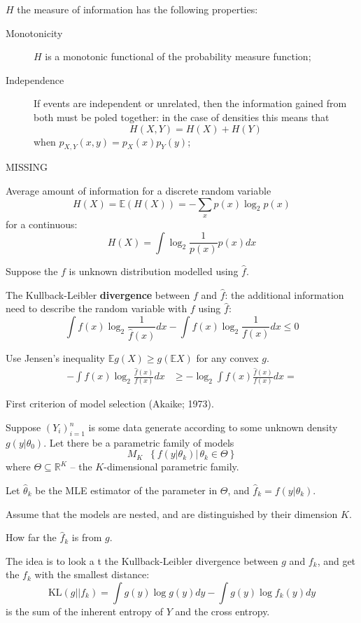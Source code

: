 \documentclass[a4paper]{article}
\newcommand{\obj}[1]{{\left\{ #1 \right \}}}
\newcommand{\brac}[1]{{\left ( #1 \right )}}
\newcommand{\induc}[1]{{\left . #1 \right \vert}}
\newcommand{\Real}{\mathbb{R}}
\newcommand{\Ex}[0]{{\mathbb{E}}}
\newcommand{\defn}{\mathop{\overset{\Delta}{=}}\nolimits}
\begin{document}
$H$ the measure of information has the following properties: \begin{description}
	\item[Monotonicity] $H$ is a monotonic functional of the probability measure function;
	\item[Independence] If events are independent or unrelated, then the information gained from both must be poled together: in the case of densities this means that
\[H(X,Y) = H(X)+H(Y)\]
when $p_{X,Y}(x,y) = p_X(x) p_Y(y)$;
	\item[MISSING]
\end{description}

Average amount of information for a discrete random variable
\[H(X) = \Ex\brac{H(X)} = - \sum_x p(x) \log_2 p(x)\]
for a continuous:
\[H(X) = \int \log_2\frac{1}{p(x)} p(x) dx\]

Suppose the $f$ is unknown distribution modelled using $\hat{f}$.

The Kullback-Leibler \textbf{divergence} between $f$ and $\hat{f}$: the additional information need to describe the random variable with $f$ using $\hat{f}$: \[\int f(x) \log_2\frac{1}{\hat{f}(x)} dx - \int f(x) \log_2\frac{1}{f(x)} dx \leq 0 \]

Use Jensen's inequality $\Ex g(X) \geq g\brac{\Ex X}$ for any convex $g$.
\begin{align*}
	-\int f(x) \log_2\frac{\hat{f}(x)}{f(x)} dx & \geq -\log_2\int f(x) \frac{\hat{f}(x)}{f(x)}  dx = 
\end{align*}

First criterion of model selection (Akaike; 1973).

Suppose $\brac{Y_i}_{i=1}^n$ is some data generate according to some unknown density $g\brac{\induc{y}\theta_0}$. Let there be a parametric family of models
\[M_K \defn \obj{\induc{f\brac{\induc{y}\theta_k}}\,\theta_k\in \Theta}\]
where $\Theta\subseteq \Real^K$ -- the $K$-dimensional parametric family.

Let $\hat{\theta}_k$ be the MLE estimator of the parameter in $\Theta$, and $\hat{f}_k = f\brac{\induc{y}\theta_k}$.

Assume that the models are nested, and are distinguished by their dimension $K$.

How far the $\hat{f}_k$ is from $g$.

The idea is to look a t the Kullback-Leibler divergence between $g$ and $f_k$, and get the $f_k$ with the smallest distance:
\[\text{KL}(g||f_k) = \int g(y) \log g(y) dy - \int g(y) \log f_k(y) dy\]
is the sum of the inherent entropy of $Y$ and the cross entropy.
\end{document}
